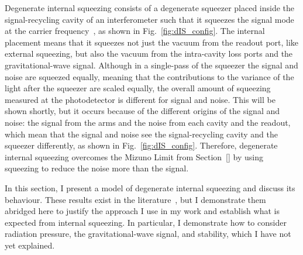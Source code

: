 Degenerate internal squeezing consists of a degenerate squeezer placed inside the signal-recycling cavity of an interferometer such that it squeezes the signal mode at the carrier frequency~\cite{}, as shown in Fig.~\ref{fig:dIS_config}. The internal placement means that it squeezes not just the vacuum from the readout port, like external squeezing, but also the vacuum from the intra-cavity loss ports and the gravitational-wave signal. Although in a single-pass of the squeezer the signal and noise are squeezed equally, meaning that the contributions to the variance of the light after the squeezer are scaled equally, %
the overall amount of squeezing measured at the photodetector is different for signal and noise. This will be shown shortly, but it occurs because of the different origins of the signal and noise: the signal from the arms and the noise from each cavity and the readout, which mean that the signal and noise see  the signal-recycling cavity and the squeezer differently, as shown in Fig.~\ref{fig:dIS_config}. 
Therefore, degenerate internal squeezing overcomes the Mizuno Limit from Section~\ref{} by using squeezing to reduce the noise more than the signal.

In this section, I present a model of degenerate internal squeezing and discuss its behaviour. These results exist in the literature~\cite{}, but I demonstrate them abridged here to justify the approach I use in my work and establish what is expected from internal squeezing. In particular, I demonstrate how to consider radiation pressure, the gravitational-wave signal, and stability, which I have not yet explained.

